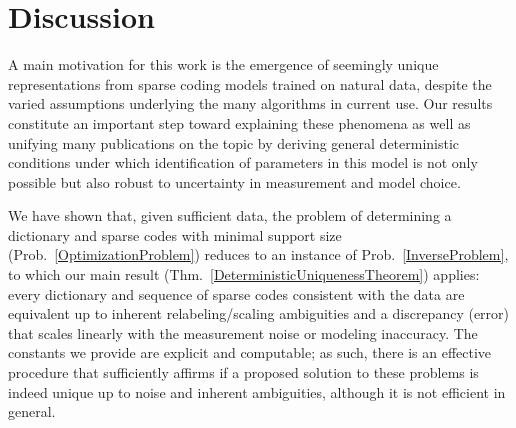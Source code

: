 \documentclass[journal, twocolumn]{IEEEtran}
\begin{document}


\section{Discussion}\label{Discussion}

A main motivation for this work is the emergence of seemingly unique representations from sparse coding models trained on natural data, despite the varied assumptions underlying the many algorithms in current use. Our results constitute an important step toward explaining these phenomena as well as unifying many publications on the topic by deriving general deterministic conditions under which identification of parameters in this model is not only possible but also robust to uncertainty in measurement and model choice.

We have shown that, given sufficient data, the problem of determining a dictionary and sparse codes with minimal support size (Prob.~\ref{OptimizationProblem}) reduces to an instance of Prob.~\ref{InverseProblem}, to which our main result (Thm.~\ref{DeterministicUniquenessTheorem}) applies: every dictionary and sequence of sparse codes consistent with the data are equivalent up to inherent relabeling/scaling ambiguities and a discrepancy (error) that scales linearly with the measurement noise or modeling inaccuracy. The constants we provide are explicit and computable; as such, there is an effective procedure that sufficiently affirms if a proposed solution to these problems is indeed unique up to noise and inherent ambiguities, although it is not efficient in general.
\end{document}
